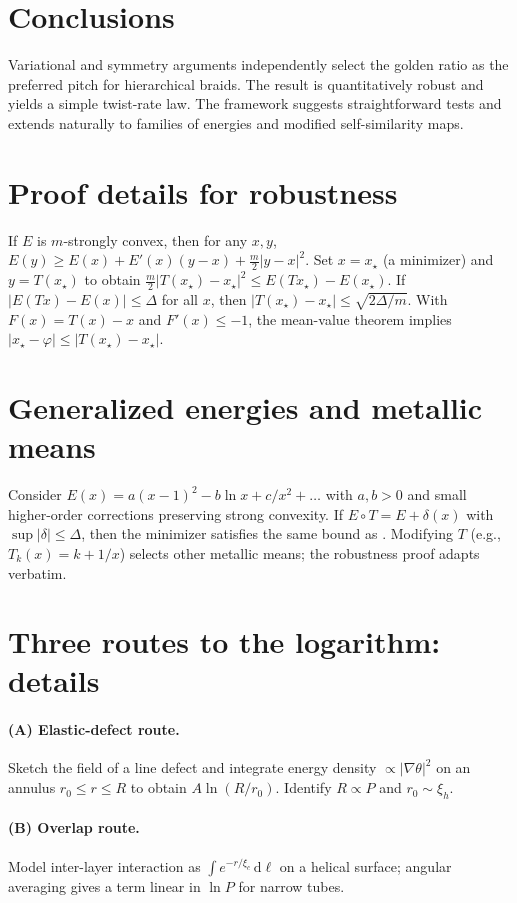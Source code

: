 \documentclass[11pt]{article}
\theoremstyle{remark}
\theoremstyle{definition}
\newcommand{\ph}{\varphi}
\begin{document}
\section{Conclusions}
Variational and symmetry arguments independently select the golden ratio as the preferred pitch for hierarchical braids. The result is quantitatively robust and yields a simple twist-rate law. The framework suggests straightforward tests and extends naturally to families of energies and modified self-similarity maps.

\appendix
\section{Proof details for robustness}
If $E$ is $m$-strongly convex, then for any $x,y$, $E(y)\ge E(x)+E'(x)(y-x)+\tfrac{m}{2}|y-x|^2$. Set $x=x_\star$ (a minimizer) and $y=T(x_\star)$ to obtain $\tfrac{m}{2}|T(x_\star)-x_\star|^2\le E(Tx_\star)-E(x_\star)$. If $|E(Tx)-E(x)|\le\Delta$ for all $x$, then $|T(x_\star)-x_\star|\le \sqrt{2\Delta/m}$. With $F(x)=T(x)-x$ and $F'(x)\le-1$, the mean-value theorem implies $|x_\star-\ph|\le |T(x_\star)-x_\star|$.

\section{Generalized energies and metallic means}
Consider $E(x)=a(x-1)^2 - b\ln x + c/x^2 + \dots$ with $a,b>0$ and small higher-order corrections preserving strong convexity. If $E\circ T=E+\delta(x)$ with $\sup|\delta|\le\Delta$, then the minimizer satisfies the same bound as . Modifying $T$ (e.g., $T_k(x)=k+1/x$) selects other metallic means; the robustness proof adapts verbatim.

\section{Three routes to the logarithm: details}
\paragraph{(A) Elastic-defect route.} Sketch the field of a line defect and integrate energy density $\propto |\nabla\theta|^2$ on an annulus $r_0\le r\le R$ to obtain $A\ln(R/r_0)$. Identify $R\propto P$ and $r_0\sim \xi_h$.
\paragraph{(B) Overlap route.} Model inter-layer interaction as $\int e^{-r/\xi_c}\,\mathrm d\ell$ on a helical surface; angular averaging gives a term linear in $\ln P$ for narrow tubes.
\end{document}
